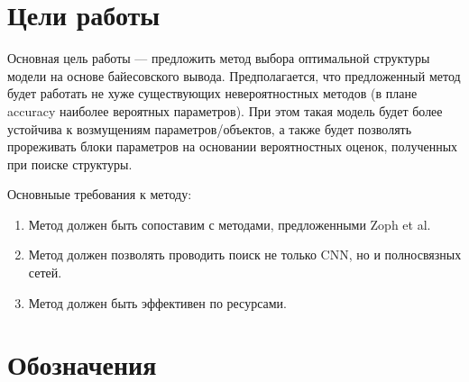 \documentclass[12pt]{article}
\begin{document}
\section{Цели работы}
Основная цель работы --- предложить метод выбора оптимальной структуры модели на основе байесовского вывода.
Предполагается, что предложенный метод будет работать не хуже существующих невероятностных методов (в плане accuracy наиболее вероятных параметров).
При этом такая модель будет более устойчива к возмущениям параметров/объектов, а также будет позволять прореживать блоки параметров на основании вероятностных оценок, полученных при поиске структуры.

Основныые требования к методу:
\begin{enumerate}
\item Метод должен быть сопоставим с методами, предложенными Zoph et al.
\item Метод должен позволять проводить поиск не только CNN, но и полносвязных сетей.
\item Метод должен быть эффективен по ресурсами.

\end{enumerate}
\newpage
\section{Обозначения}
\end{document}
